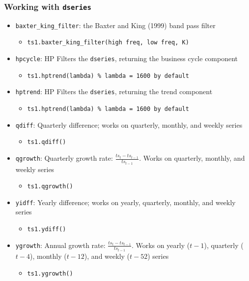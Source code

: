 \documentclass[10pt]{beamer}
\newcommand{\myitem}{\item[$\bullet$]}
\begin{document}
\begin{frame}[fragile,t]
  \frametitle{Working with \texttt{dseries}}
  \begin{itemize}
  \myitem \texttt{baxter\_king\_filter}: the Baxter and King (1999) band pass filter
    \begin{itemize}
    \myitem \texttt{ts1.baxter\_king\_filter(high freq, low freq, K)}
    \end{itemize}
  \myitem \texttt{hpcycle}: HP Filters the \texttt{dseries}, returning the business cycle component
    \begin{itemize}
    \myitem \texttt{ts1.hptrend(lambda) \% lambda = 1600 by default}
    \end{itemize}
  \myitem \texttt{hptrend}: HP Filters the \texttt{dseries}, returning the trend component
    \begin{itemize}
    \myitem \texttt{ts1.hptrend(lambda) \% lambda = 1600 by default}
    \end{itemize}
  \myitem \texttt{qdiff}: Quarterly difference; works on quarterly, monthly, and weekly series
    \begin{itemize}
    \myitem \texttt{ts1.qdiff()}
    \end{itemize}
  \myitem \texttt{qgrowth}: Quarterly growth rate: $\frac{ts_t-ts_{t-1}}{ts_{t-1}}$. Works on quarterly, monthly, and weekly series
    \begin{itemize}
    \myitem \texttt{ts1.qgrowth()}
    \end{itemize}
  \myitem \texttt{yidff}: Yearly difference; works on yearly, quarterly, monthly, and weekly series
    \begin{itemize}
    \myitem \texttt{ts1.ydiff()}
    \end{itemize}
  \myitem \texttt{ygrowth}: Annual growth rate: $\frac{ts_t-ts_{t-1}}{ts_{t-1}}$. Works on yearly ($t-1$), quarterly ($t-4$), monthly ($t-12$), and weekly ($t-52$) series
    \begin{itemize}
    \myitem \texttt{ts1.ygrowth()}
    \end{itemize}
  \end{itemize}
\end{frame}
\end{document}
